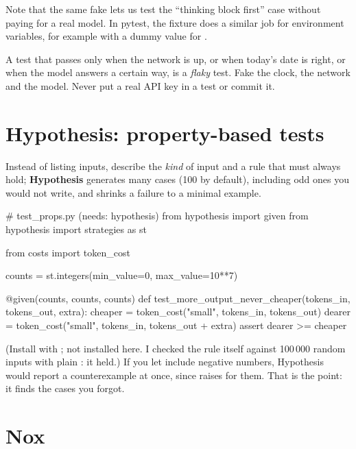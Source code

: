 Note that the same fake lets us test the ``thinking block first'' case without paying for a real model.
In pytest, the  fixture does a similar job for environment variables, for example
 with a dummy value for .

\begin{trap}
A test that passes only when the network is up, or when today's date is right, or when the model answers a
certain way, is a \emph{flaky} test. Fake the clock, the network and the model. Never put a real API key in a test or commit it.
\end{trap}

\section{Hypothesis: property-based tests}

Instead of listing inputs, describe the \emph{kind} of input and a rule that must always hold; \textbf{Hypothesis} generates many
cases (100 by default), including odd ones you would not write, and shrinks a failure to a minimal example.

\begin{pycode}
# test_props.py   (needs: hypothesis)
from hypothesis import given
from hypothesis import strategies as st

from costs import token_cost

counts = st.integers(min_value=0, max_value=10**7)


@given(counts, counts, counts)
def test_more_output_never_cheaper(tokens_in, tokens_out, extra):
    cheaper = token_cost("small", tokens_in, tokens_out)
    dearer = token_cost("small", tokens_in, tokens_out + extra)
    assert dearer >= cheaper
\end{pycode}

(Install with ; not installed here. I checked the rule itself against
100\,000 random inputs with plain : it held.) If you let  include negative numbers,
Hypothesis would report a counterexample at once, since  raises  for them.
That is the point: it finds the cases you forgot.

\section{Nox}

